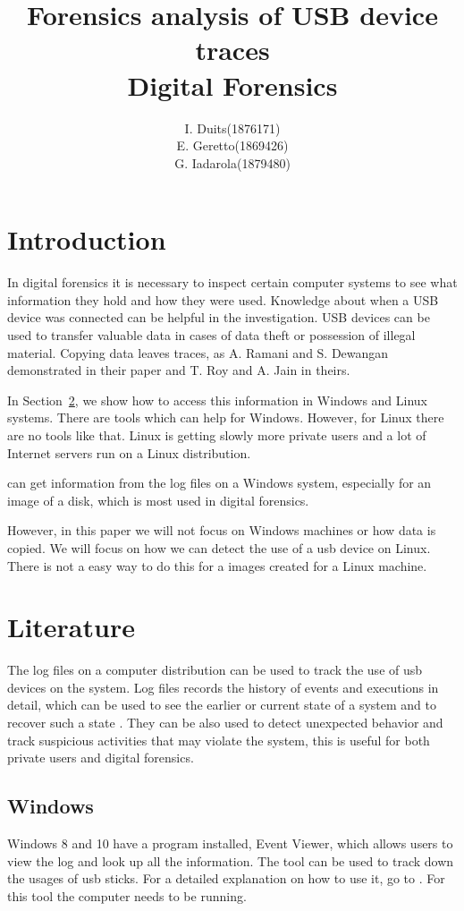 \documentclass[a4paper]{article}
\title{Forensics analysis of USB device traces\\
\large Digital Forensics}
\author{
\begin{tabular}{>{\raggedleft}m{5cm}m{5cm}}
I. Duits & (1876171) \\
E. Geretto & (1869426) \\
G. Iadarola & (1879480) \\
\end{tabular}
}
\begin{document}
\maketitle

\section{Introduction}
In digital forensics it is necessary to inspect certain computer systems to see what information they hold and how they were used. Knowledge about when a USB device was connected can be helpful in the investigation. USB devices can be used to transfer valuable data in cases of data theft or possession of illegal material. Copying data leaves traces, as A. Ramani and S. Dewangan demonstrated in their paper \cite{Abhijeet14} and T. Roy and A. Jain in theirs.~\cite{Tanushree12} 

In Section~\ref{sec:lit}, we show how to access this information in Windows and Linux systems. There are tools which can help for Windows. However, for Linux there are no tools like that. Linux is getting slowly more private users\cite{osShare} and a lot of Internet servers run on a Linux distribution\cite{InternetServer}. 

can get information from the log files on a Windows system, especially for an image of a disk, which is most used in digital forensics. 

However, in this paper we will not focus on Windows machines or how data is copied. We will focus on how we can detect the use of a usb device on Linux. There is not a easy way to do this for a images created for a Linux machine.




\section{Literature}\label{sec:lit}
The log files on a computer distribution can be used to track the use of usb devices on the system. 
Log files records the history of events and executions in detail, which can be used to see the earlier or current state of a system and to recover such a state \cite{logFiles}. They can be also used to detect unexpected behavior and track suspicious activities that may violate the system, this is useful for both private users and digital forensics. 

\subsection{Windows}\label{sec:litWindows}
Windows 8 and 10 have a program installed, Event Viewer, which allows users to view the log and look up all the information. The tool can be used to track down the usages of usb sticks. For a detailed explanation on how to use it, go to \cite{eventViewerW10}.
For this tool the computer needs to be running.
\end{document}
